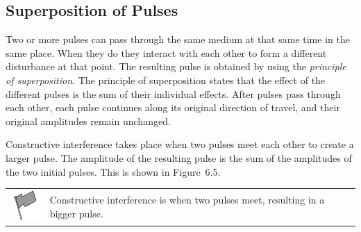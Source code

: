     
    
    
    
    
  
\label{m38802*fs-id1166232432154}
            \subsection{ Superposition of Pulses}
            \nopagebreak
            
      
      \label{m38802*id316136}Two or more pulses can pass through the same medium at that same time in the same place. When they do they interact with each other to form a different disturbance at that point. The resulting pulse is obtained by using the \textsl{principle of superposition}. The principle of superposition states that the effect of the different pulses is the sum of their individual effects. After pulses pass through each other, each pulse continues along its original direction of travel, and their original amplitudes remain unchanged.\par 
      \label{m38802*id316148}Constructive interference takes place when two pulses meet each other to create a larger pulse. The amplitude of the resulting pulse is the sum of the amplitudes of the two initial pulses. This is shown in Figure~6.5.\par 
\label{m38802*fhsst!!!underscore!!!id567}\begin{definition}
	  \begin{tabular*}{15 cm}{m{15 mm}m{}}
	\hspace*{-50pt}  \includegraphics[width=0.5in]{col11305.imgs/psflag2.png}   & \Definition{   \label{id2436281}\textbf{ Constructive interference}} { \label{m38802*meaningfhsst!!!underscore!!!id567}
      Constructive interference is when two pulses meet, resulting in a bigger pulse. 
       } 
      \end{tabular*}
      \end{definition}

      
    \setcounter{subfigure}{0}


